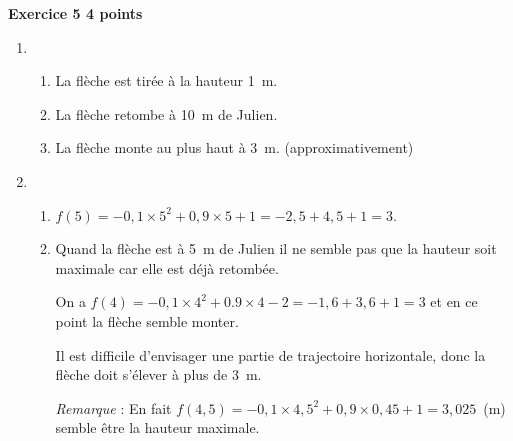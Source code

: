 \textbf{Exercice 5 \hfill 4 points}

\bigskip
 
% 
% 
%

\begin{enumerate}
\item %
	\begin{enumerate}
		\item %
		La flèche est tirée à  la hauteur 1~m. 
		\item %
		La flèche retombe à  10~m de Julien. 
		\item %
		La flèche monte au plus haut à  3~m. (approximativement)
	\end{enumerate} 
\item %
 
%
	\begin{enumerate}
		\item %
$f(5) = - 0,1 \times 5^2 + 0,9 \times 5 + 1 = - 2,5 + 4,5 + 1 = 3$. 
		\item %
Quand la flèche est à  5~m de Julien il ne semble pas que la hauteur soit  maximale car elle est déjà  retombée. 

On a $f(4) = -0,1 \times 4^2 + 0.9 \times 4 -2 = - 1,6 + 3,6 + 1 = 3$ et en ce point la flèche semble monter.

Il est difficile d’envisager une partie de trajectoire horizontale, donc la flèche doit s'élever à  plus de 3~m.

\emph{Remarque} :  En fait $f(4,5) = - 0,1 \times 4,5^2 + 0,9 \times 0,45 + 1 = 3,025$~(m) semble être la hauteur maximale.
	\end{enumerate} 
\end{enumerate} 

\bigskip
 
